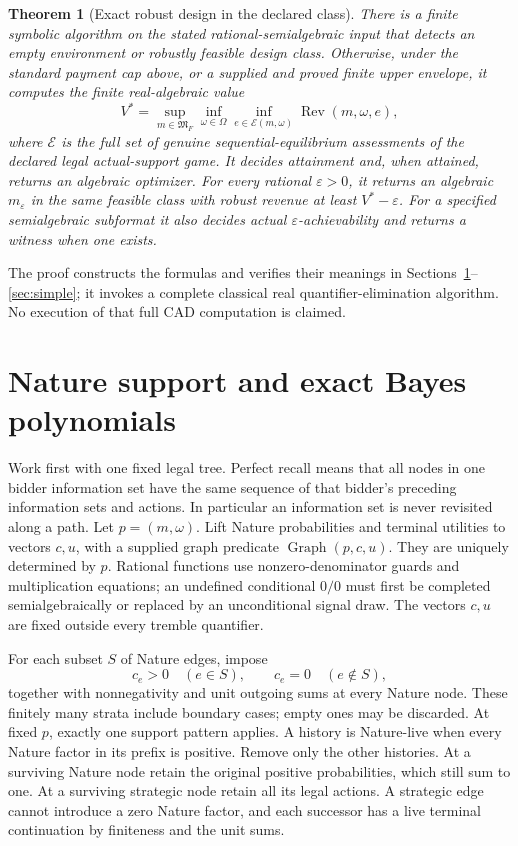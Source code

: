 \documentclass[11pt,a4paper]{article}
\numberwithin{equation}{section}
\newtheorem{theorem}{Theorem}
\theoremstyle{definition}
\newcommand{\cE}{\mathcal E}
\DeclareMathOperator{\Graph}{Graph}
\DeclareMathOperator{\Rev}{Rev}
\begin{document}
\begin{theorem}[Exact robust design in the declared class]\label{thm:main}
There is a finite symbolic algorithm on the stated rational-semialgebraic
input that detects an empty environment or robustly feasible design
class. Otherwise, under the standard payment cap above, or a supplied
and proved finite upper envelope, it computes the finite real-algebraic
value
\[
 V^*=\sup_{m\in\mathfrak M_F}\inf_{\omega\in\Omega}
          \inf_{e\in\cE(m,\omega)}\Rev(m,\omega,e),
\]
where \(\cE\) is the full set of genuine sequential-equilibrium
assessments of the declared legal actual-support game.
It decides attainment and, when attained, returns an algebraic
optimizer. For every rational \(\varepsilon>0\), it returns an
algebraic \(m_\varepsilon\) in the same feasible class with robust
revenue at least \(V^*-\varepsilon\).
For a specified semialgebraic subformat it also decides actual
\(\varepsilon\)-achievability and returns a witness when one exists.
\end{theorem}
The proof constructs the formulas and verifies their meanings in
Sections~\ref{sec:bayes}--\ref{sec:simple}; it invokes a complete
classical real quantifier-elimination algorithm.
No execution of that full CAD computation is claimed.

\section{Nature support and exact Bayes polynomials}\label{sec:bayes}
Work first with one fixed legal tree.
Perfect recall means that all nodes in one bidder information set have
the same sequence of that bidder's preceding information sets and
actions. In particular an information set is never revisited along a path.
Let \(p=(m,\omega)\). Lift Nature probabilities and terminal utilities
to vectors \(c,u\), with a supplied graph predicate \(\Graph(p,c,u)\).
They are uniquely determined by \(p\).
Rational functions use nonzero-denominator guards and multiplication
equations; an undefined conditional \(0/0\) must first be completed
semialgebraically or replaced by an unconditional signal draw.
The vectors \(c,u\) are fixed outside every tremble quantifier.

For each subset \(S\) of Nature edges, impose
\[
 c_e>0\quad(e\in S),\qquad c_e=0\quad(e\notin S),
\]
together with nonnegativity and unit outgoing sums at every Nature node.
These finitely many strata include boundary cases; empty ones may be
discarded. At fixed \(p\), exactly one support pattern applies.
A history is Nature-live when every Nature factor in its prefix is
positive. Remove only the other histories.
At a surviving Nature node retain the original positive probabilities,
which still sum to one.
At a surviving strategic node retain all its legal actions.
A strategic edge cannot introduce a zero Nature factor, and each
successor has a live terminal continuation by finiteness and the unit sums.
\end{document}

